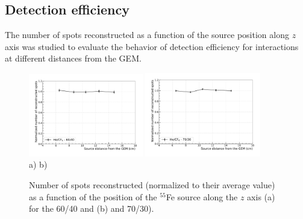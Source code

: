\documentclass[a4paper,11pt]{article}
\begin{document}

%



\subsection{Detection efficiency}
\label{cap:detect}

The number of spots reconstructed as a function of the source position along $z$ axis was studied to evaluate the behavior of detection efficiency for interactions at different distances from the GEM.

\begin{figure}[ht]
\centering
\includegraphics[width=0.445\textwidth]{Figures/feZscan6040_wo_4.pdf}
\includegraphics[width=0.45\textwidth]{Figures/feZscan7030_wo_4.pdf}\\
\vspace{-0.3cm}
\mbox{a)} \hspace{6cm} \mbox{b)}
\vspace{-0.3cm}

\caption{Number of spots reconstructed (normalized to their average value) as a function of the position of the $^{55}$Fe source along the $z$ axis (a) for the 60/40 and (b) and 70/30).} 
\label{fig:effZ}
\end{figure}
\end{document}

